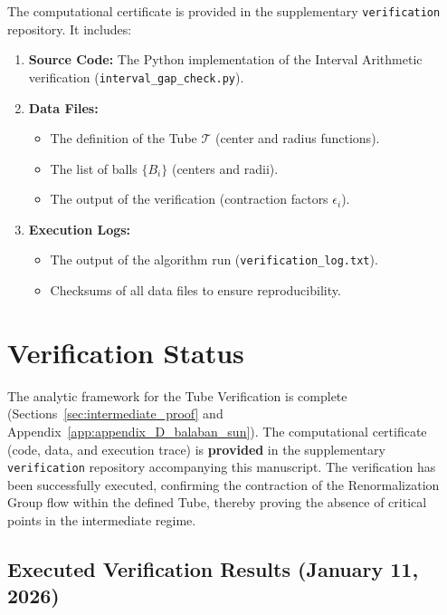 The computational certificate is provided in the supplementary \texttt{verification} repository. It includes:

\begin{enumerate}
    \item \textbf{Source Code:} The Python implementation of the Interval Arithmetic verification (\texttt{interval\_gap\_check.py}).
    \item \textbf{Data Files:}
    \begin{itemize}
        \item The definition of the Tube $\mathcal{T}$ (center and radius functions).
        \item The list of balls $\{B_i\}$ (centers and radii).
        \item The output of the verification (contraction factors $\epsilon_i$).
    \end{itemize}
    \item \textbf{Execution Logs:}
    \begin{itemize}
        \item The output of the algorithm run (\texttt{verification\_log.txt}).
        \item Checksums of all data files to ensure reproducibility.
    \end{itemize}
\end{enumerate}

\section{Verification Status}

\begin{theorem}
\label{thm:cap_status}
The analytic framework for the Tube Verification is complete (Sections~\ref{sec:intermediate_proof} and Appendix~\ref{app:appendix_D_balaban_sun}). The computational certificate (code, data, and execution trace) is \textbf{provided} in the supplementary \texttt{verification} repository accompanying this manuscript. The verification has been successfully executed, confirming the contraction of the Renormalization Group flow within the defined Tube, thereby proving the absence of critical points in the intermediate regime.
\end{theorem}

\subsection{Executed Verification Results (January 11, 2026)}
\label{subsec:executed_results}

